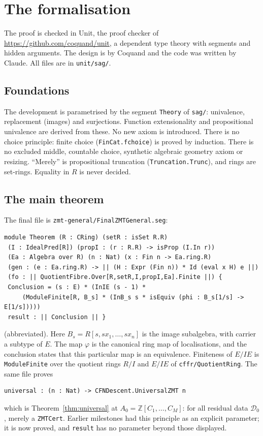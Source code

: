 \documentclass[11pt]{amsart}
\numberwithin{equation}{section}
\theoremstyle{definition}
\theoremstyle{remark}
\newcommand{\code}[1]{\texttt{#1}}
\newcommand{\ZZ}{\mathbb Z}
\begin{document}
\section{The formalisation}\label{sec:formal}

The proof is checked in Unit, the proof checker of
\url{https://github.com/coquand/unit}, a dependent type theory with
segments and hidden arguments. The design is by Coquand and the code
was written by Claude. All files are in \code{unit/sag/}.

\subsection{Foundations}
The development is parametrised by the segment \code{Theory} of
\code{sag/}: univalence, replacement (images) and surjections. Function
extensionality and propositional univalence are derived from these. No
new axiom is introduced. There is no choice principle: finite choice
(\code{FinCat.fchoice}) is proved by induction. There is no excluded
middle, countable choice, synthetic algebraic geometry axiom or
resizing. ``Merely'' is propositional truncation
(\code{Truncation.Trunc}), and rings are set-rings. Equality in $R$ is
never decided.

\subsection{The main theorem}
The final file is \code{zmt-general/FinalZMTGeneral.seg}:
\begin{verbatim}
module Theorem (R : CRing) (setR : isSet R.R)
 (I : IdealPred[R]) (propI : (r : R.R) -> isProp (I.In r))
 (Ea : Algebra over R) (n : Nat) (x : Fin n -> Ea.ring.R)
 (gen : (e : Ea.ring.R) -> || (H : Expr (Fin n)) * Id (eval x H) e ||)
 (fo : || QuotientFibre.Over[R,setR,I,propI,Ea].Finite ||) {
 Conclusion = (s : E) * (InIE (s - 1) *
     (ModuleFinite[R, B_s] * (InB_s s * isEquiv (phi : B_s[1/s] -> E[1/s]))))
 result : || Conclusion || }
\end{verbatim}
(abbreviated). Here $B_s=R[s,sx_1,\ldots,sx_n]$ is the image subalgebra,
with carrier a subtype of $E$. The map $\varphi$ is the canonical ring map
of localisations, and the conclusion states that this particular map is
an equivalence. Finiteness of $E/IE$ is \code{ModuleFinite} over the
quotient rings $R/I$ and $E/IE$ of \code{cffr/QuotientRing}. The same
file proves
\begin{verbatim}
universal : (n : Nat) -> CFNDescent.UniversalZMT n
\end{verbatim}
which is Theorem~\ref{thm:universal} at $A_0=\ZZ[C_1,\ldots,C_M]$: for
all residual data $\mathcal D_0$, merely a \code{ZMTCert}. Earlier
milestones had this principle as an explicit parameter; it is now
proved, and \code{result} has no parameter beyond those displayed.
\end{document}
